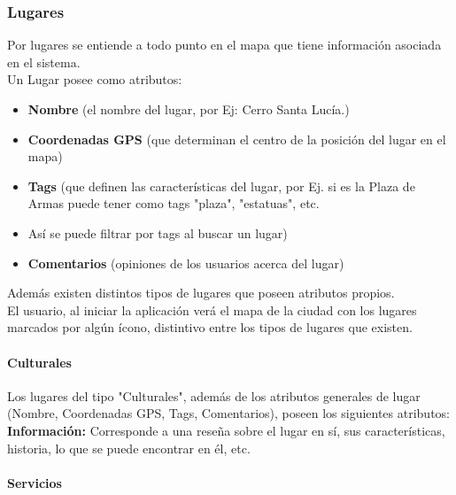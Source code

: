 \documentclass[10pt,letterpaper]{article}
\begin{document}
\subsubsection{Lugares}

Por lugares se entiende a todo punto en el mapa que tiene información asociada en el sistema.\\

Un Lugar posee como atributos:\\

\begin{itemize}
 \item \textbf{Nombre} (el nombre del lugar, por Ej: Cerro Santa Lucía.)
 \item \textbf{Coordenadas GPS} (que determinan el centro de la posición del lugar en el mapa)
 \item \textbf{Tags} (que definen las características del lugar, por Ej. si es la Plaza de Armas puede tener como tags "plaza", "estatuas", etc.  \item Así se puede filtrar por tags al buscar un lugar)
 \item \textbf{Comentarios} (opiniones de los usuarios acerca del lugar)
\end{itemize}

Además existen distintos tipos de lugares que poseen atributos propios.\\

El usuario, al iniciar la aplicación verá el mapa de la ciudad con los lugares marcados por algún ícono, distintivo entre los tipos de lugares que existen.\\

\paragraph{Culturales}

Los lugares del tipo "Culturales", además de los atributos generales de lugar (Nombre, Coordenadas GPS, Tags, Comentarios), poseen los siguientes atributos:\\

\textbf{Información:} Corresponde a una reseña sobre el lugar en sí, sus características, historia, lo que se puede encontrar en él, etc.\\

\paragraph{Servicios}
\end{document}
